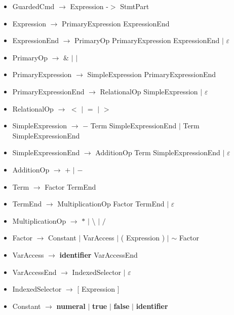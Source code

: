 \documentclass{article}
\let\bf\textbf
\newcommand{\der}{$\longrightarrow$ }
\newcommand{\es}{$\varepsilon$ }
\newcommand{\alt}{\Large$|$ \normalsize }
\begin{document}
\begin{itemize}[label={}]
    \item GuardedCmd \der Expression -$>$ StmtPart
    \item Expression \der PrimaryExpression ExpressionEnd
    \item ExpressionEnd \der PrimaryOp PrimaryExpression ExpressionEnd \alt \es
    \item PrimaryOp \der $\&$ \alt $|$
    \item PrimaryExpression \der SimpleExpression PrimaryExpressionEnd
    \item PrimaryExpressionEnd \der RelationalOp SimpleExpression \alt \es
    \item RelationalOp \der $<$ \alt $=$ \alt $>$
    \item SimpleExpression \der $-$ Term SimpleExpressionEnd \alt Term SimpleExpressionEnd
    \item SimpleExpressionEnd \der AdditionOp Term SimpleExpressionEnd \alt \es
    \item AdditionOp \der $+$ \alt $-$
    \item Term \der Factor TermEnd
    \item TermEnd \der MultiplicationOp Factor TermEnd \alt \es
    \item MultiplicationOp \der $*$ \alt \textbackslash\: \alt $/$ 
    \item Factor \der Constant \alt VarAccess \alt ( Expression ) \alt $\sim$ Factor
    \item VarAccess \der \bf{identifier} VarAccessEnd 
    \item VarAccessEnd \der IndexedSelector \alt \es
    \item IndexedSelector \der [ Expression ]
    \item Constant \der \bf{numeral} \alt \bf{true} \alt \bf{false} \alt \bf{identifier}
\end{itemize}
\end{document}
